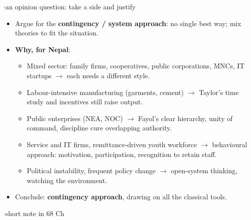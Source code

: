 {\color{sub}\footnotesize {}  \gap$\cdot$\gap an opinion question: take a side and justify}
\begin{itemize}
  \item Argue for the \textbf{contingency / system approach}: no single best way; mix
    theories to fit the situation.
  \item \textbf{Why, for Nepal}:
  \begin{itemize}
    \item Mixed sector: family firms, cooperatives, public corporations, MNCs, IT startups
      $\rightarrow$ each needs a different style.
    \item Labour-intensive manufacturing (garments, cement) $\rightarrow$ Taylor's time
      study and incentives still raise output.
    \item Public enterprises (NEA, NOC) $\rightarrow$ Fayol's clear hierarchy, unity of
      command, discipline cure overlapping authority.
    \item Service and IT firms, remittance-driven youth workforce $\rightarrow$ behavioural
      approach: motivation, participation, recognition to retain staff.
    \item Political instability, frequent policy change $\rightarrow$ open-system thinking,
      watching the environment.
  \end{itemize}
  \item Conclude: \textbf{contingency approach}, drawing on all the classical tools.
\end{itemize}

\vspace{2pt}


{\color{sub}\footnotesize {}  \gap$\cdot$\gap short note in 68 Ch}

